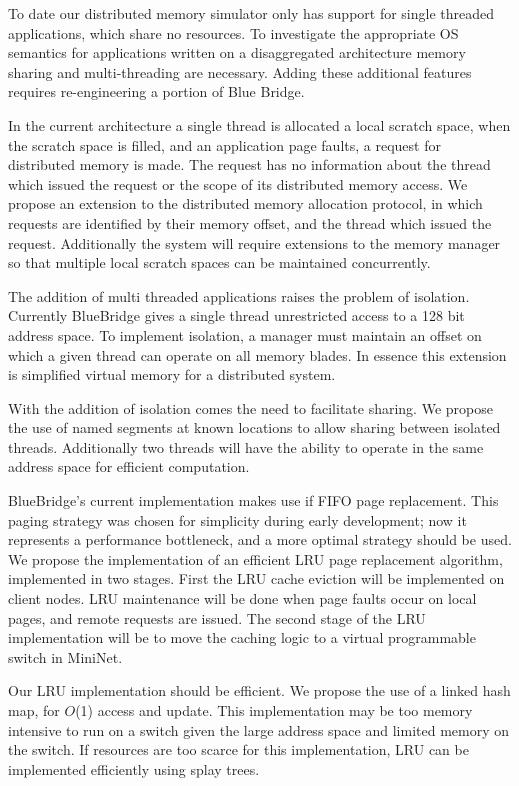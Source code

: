  To date our
distributed memory simulator only has support for single threaded
applications, which share no resources. To investigate the appropriate
OS semantics for applications written on a disaggregated architecture
memory sharing and multi-threading are necessary. Adding these
additional features requires re-engineering a portion of Blue Bridge.

In the current architecture a single thread is allocated a local
scratch space, when the scratch space is filled, and an application
page faults, a request for distributed memory is made. The request has
no information about the thread which issued the request or the scope
of its distributed memory access. We propose an extension to the
distributed memory allocation protocol, in which requests are
identified by their memory offset, and the thread which issued the
request. Additionally the system will require extensions to the memory
manager so that multiple local scratch spaces can be maintained
concurrently.

The addition of multi threaded applications raises the problem of
isolation. Currently BlueBridge gives a single thread unrestricted
access to a 128 bit address space. To implement isolation, a manager
must maintain an offset on which a given thread can operate on all
memory blades. In essence this extension is simplified virtual memory
for a distributed system.

With the addition of isolation comes the need to facilitate sharing.
We propose the use of named segments at known locations to allow
sharing between isolated threads. Additionally two threads will have
the ability to operate in the same address space for efficient
computation.

 BlueBridge's current implementation
makes use if FIFO page replacement. This paging strategy was chosen
for simplicity during early development; now it represents a
performance bottleneck, and a more optimal strategy should be used. We
propose the implementation of an efficient LRU page replacement
algorithm, implemented in two stages. First the LRU cache eviction
will be implemented on client nodes. LRU maintenance will be done when
page faults occur on local pages, and remote requests are issued. The
second stage of the LRU implementation will be to move the caching
logic to a virtual programmable switch in MiniNet.

Our LRU implementation should be efficient. We propose the use of a
linked hash map, for $O$(1) access and update. This implementation may
be too memory intensive to run on a switch given the large address
space and limited memory on the switch. If resources are too scarce
for this implementation, LRU can be implemented efficiently using
splay trees.


